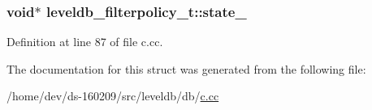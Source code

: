 \subsubsection[{state\+\_\+}]{\setlength{\rightskip}{0pt plus 5cm}void$\ast$ leveldb\+\_\+filterpolicy\+\_\+t\+::state\+\_\+}\label{structleveldb__filterpolicy__t_a35aa5dd2f350f6eafa4ae904e55dcbe2}


Definition at line 87 of file c.\+cc.



The documentation for this struct was generated from the following file\+:\begin{DoxyCompactItemize}
\item 
/home/dev/ds-\/160209/src/leveldb/db/\hyperlink{c_8cc}{c.\+cc}\end{DoxyCompactItemize}

